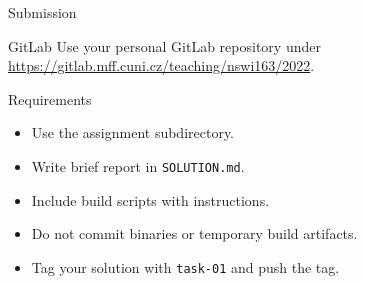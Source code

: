 \begin{frame}{Submission}
    \begin{block}{GitLab}
        Use your personal GitLab repository under \\
        \url{https://gitlab.mff.cuni.cz/teaching/nswi163/2022}.
    \end{block}
    \begin{block}{Requirements}
        \begin{itemize}
            \item Use the assignment subdirectory.
            \item Write brief report in \lstinline{SOLUTION.md}.
            \item Include build scripts with instructions.
            \item Do not commit binaries or temporary build artifacts.
            \item Tag your solution with \lstinline{task-01} and push the tag.
        \end{itemize}
    \end{block}
\end{frame}



